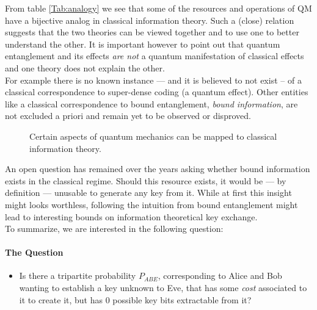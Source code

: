 From table \ref{Tab:analogy} we see that some of the resources and operations of QM have a bijective analog in classical information theory. 
Such a (close) relation suggests that the two theories can be viewed together and to use one to better understand the other. 
It is important however to point out that quantum entanglement and its effects \emph{are not} a quantum manifestation of classical effects and one theory does not explain the other. \\
For example there is no known instance --- and it is believed to not exist -- of a classical correspondence to super-dense coding (a quantum effect). Other entities like a classical correspondence to bound entanglement, \emph{bound information}, are not excluded a priori and remain yet to be observed or disproved.\\

	\begin{figure}[h!]
		\centering
		
		\caption{Certain aspects of quantum mechanics can be mapped to classical information theory.}
		\label{Fig:bigpicture}
	\end{figure}
An open question has remained over the years asking whether bound information exists in the classical regime.
Should this resource exists, it would be --- by definition --- unusable to generate any key from it.
While at first this insight might looks worthless, 
following the intuition from bound entanglement might lead to interesting bounds on information theoretical key exchange.\\
To summarize, we are interested in the following question:

\paragraph*{The Question}
\begin{itemize}
		\item[] Is there a tripartite probability $P_{ABE}$, corresponding to Alice and Bob wanting to establish a key unknown to Eve, that has some \emph{cost} associated to it to create it, but has $0$ possible key bits extractable from it? 
\end{itemize}


	